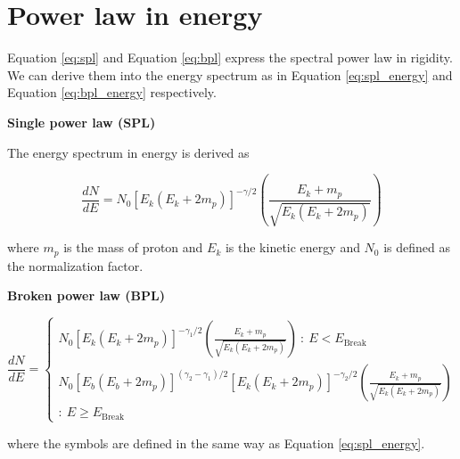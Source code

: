 \chapter{Power law in energy}
\label{appendix:pw_energy}

Equation \ref{eq:spl} and Equation \ref{eq:bpl}
express the spectral power law in rigidity.
We can derive them
into the 
energy spectrum as in Equation \ref{eq:spl_energy} and 
Equation \ref{eq:bpl_energy} respectively. 

\textbf{Single power law (SPL)}

The energy spectrum in energy is derived as

\begin{equation}
    \frac{dN}{dE} = N_0[E_k(E_k+2m_p)]^{-\gamma/2} \left(\frac{E_k+m_p}{\sqrt{E_k(E_k+2m_p)}}\right)
    \label{eq:spl_energy}
\end{equation}

where $m_p$ is the mass of proton and $E_k$ is the kinetic 
energy and $N_0$ is defined as the normalization factor.


\textbf{Broken power law (BPL)}

\begin{equation}
\frac{dN}{dE}=
  \begin{cases}
    N_0[E_k(E_k+2m_p)]^{-\gamma_1/2} \left(\frac{E_k+m_p}{\sqrt{E_k(E_k+2m_p)}}\right)\ :\ E < E_{\text{Break}}\\
    N_0[E_b(E_b+2m_p)]^{(\gamma_2-\gamma_1)/2}[E_k(E_k+2m_p)]^{-\gamma_2/2} \left(\frac{E_k+m_p}{\sqrt{E_k(E_k+2m_p)}}\right)\\ :\ E \ge E_{\text{Break}}
  \end{cases}
  \label{eq:bpl_energy}
\end{equation}

where the symbols are defined in the same way as Equation \ref{eq:spl_energy}.
